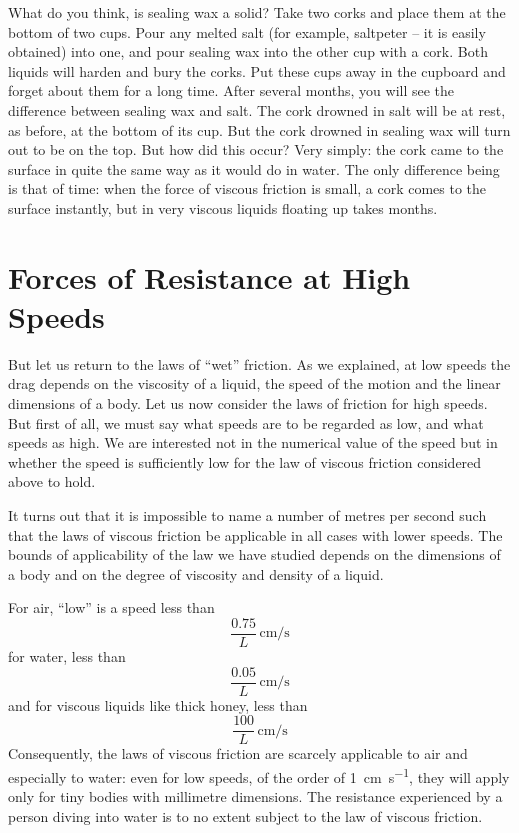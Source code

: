 What do you think, is sealing wax a solid? Take two corks and place them at the bottom of two cups. Pour any melted salt (for example, saltpeter -- it is easily obtained) into one, and pour sealing wax into the other cup with a cork. Both liquids will harden and bury the corks. Put these cups away in the cupboard and forget about them for a long time. After several months, you will see the difference between sealing wax and salt. The cork drowned in salt will be at rest, as before, at the bottom of its cup. But the cork drowned in sealing wax will turn out to be on the top. But how did this occur? Very simply: the cork came to the surface in quite the same way as it would do in water. The only difference being is that of time: when the force of viscous friction is small, a cork comes to the surface instantly, but in very viscous liquids floating up takes months.

\section{Forces of Resistance at High Speeds}

But let us return to the laws of ``wet'' friction. As we explained, at low speeds the drag depends on the viscosity of a liquid, the speed of the motion and the linear dimen­sions of a body. Let us now consider the laws of friction for high speeds. But first of all, we must say what speeds are to be regarded as low, and what speeds as high. We are interested not in the numerical value of the speed but in whether the speed is sufficiently low for the law of viscous friction considered above to hold.

It turns out that it is impossible to name a number of metres per second such that the laws of viscous friction be applicable in all cases with lower speeds. The bounds of applicability of the law we have studied depends on the dimensions of a body and on the degree of viscosity and density of a liquid.

For air, ``low'' is a speed less than
\begin{equation*}%
\frac{0.75}{L}\, \si{\centi\meter\per\second}
\end{equation*}
for water, less than
\begin{equation*}%
\frac{0.05}{L} \, \si{\centi\meter\per\second}
\end{equation*}
and for viscous liquids like thick honey, less than
\begin{equation*}%
\frac{100}{L} \, \si{\centi\meter\per\second}
\end{equation*}
Consequently, the laws of viscous friction are scarcely applicable to air and especially to water: even for low speeds, of the order of \SI{1}{\centi\meter\per\second}, they will apply only for tiny bodies with millimetre dimensions. The resistance experienced by a person diving into water is to no extent subject to the law of viscous friction.

